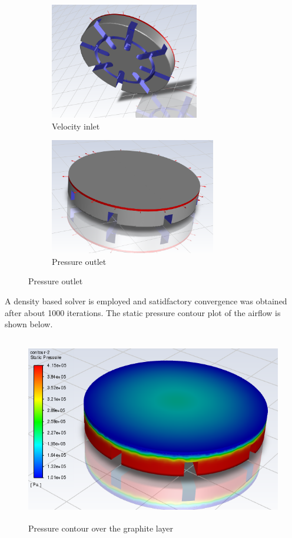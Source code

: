 \vspace{15pt}
\begin{figure}[h!]
	\centering
	\begin{subfigure}[b]{0.45\textwidth}
		\includegraphics[width=\textwidth,height=2in]{./images/airBearingInlet.png}
		\caption{Velocity inlet}
		\label{fig-air-bearing-inlet}
	\end{subfigure}
	\begin{subfigure}[b]{0.45\textwidth}
		\centering
		\includegraphics[width=\textwidth,height=2in]{./images/airBearingOutlet.png}
		\caption{Pressure outlet}
		\label{fig-air-bearing-outlet}
	\end{subfigure}
\end{figure}

A density based solver is employed and satidfactory convergence was obtained after about 1000 iterations. The static pressure contour plot of the airflow is shown below.
\pagebreak
 
\begin{figure}[h!]
	\centering
	\includegraphics[width=4.5in,height=3.22in]{./images/airBearingAnlsys.png}
	\caption{Pressure contour over the graphite layer}
	\label{fig-air-bearing-anlsys}
\end{figure}

